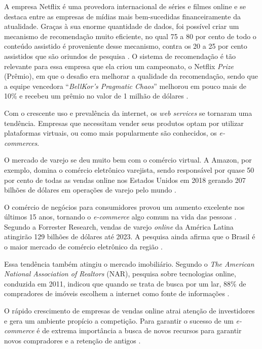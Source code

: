 A empresa Netflix é uma provedora internacional de séries e filmes online e se destaca entre as empresas de mídias mais bem-sucedidas financeiramente da atualidade. Graças à sua enorme quantidade de dados, foi possível criar um mecanismo de recomendação muito eficiente, no qual 75 a 80 por cento de todo o conteúdo assistido é proveniente desse mecanismo, contra os 20 a 25 por cento assistidos que são oriundos de pesquisa \cite{Kleinman:2014}. O sistema de recomendação é tão relevante para essa empresa que ela criou um campeonato, o Netflix \textit{Prize} (Prêmio), em que o desafio era melhorar a qualidade da recomendação, sendo que a equipe vencedora “\textit{BellKor's Pragmatic Chaos}” melhorou em pouco mais de 10\% e recebeu um prêmio no valor de 1 milhão de dólares \cite{netflixprize:2009}.

Com o crescente uso e prevalência da internet, os \textit{web services} se tornaram uma tendência. Empresas que necessitam vender seus produtos optam por utilizar plataformas virtuais, ou como mais popularmente são conhecidos, os \textit{e-commerces}.

O mercado de varejo se deu muito bem com o comércio virtual. A Amazon, por exemplo, domina o comércio eletrônico varejista, sendo responsável por quase 50 por cento de todas as vendas online nos Estados Unidos em 2018 gerando 207 bilhões de dólares em operações de varejo pelo mundo \cite{JAKE:2019}.

O comércio de negócios para consumidores provou um aumento excelente nos últimos 15 anos, tornando o \textit{e-commerce} algo comum na vida das pessoas \cite{Jiang:2015}. Segundo a Forrester Research, vendas de varejo \textit{online} da América Latina atingirão 129 bilhões de dólares até 2023. A pesquisa ainda afirma que o Brasil é o maior mercado de comércio eletrônico da região \cite{Forrester:2019}.

Essa tendência também atingiu o mercado imobiliário. Segundo o \textit{The American National Association of Realtors} (NAR), pesquisa sobre tecnologias online, conduzida em 2011, indicou que quando se trata de busca por um lar, 88\% de compradores de imóveis escolhem a internet como fonte de informações \cite{Yuan:2013}.

O rápido crescimento de empresas de vendas online atrai atenção de investidores e gera um ambiente propício a competição. Para garantir o sucesso de um \textit{e-commerce} é de extrema importância a busca de novos recursos para garantir novos compradores e a retenção de antigos \cite{Jiang:2015}. 

